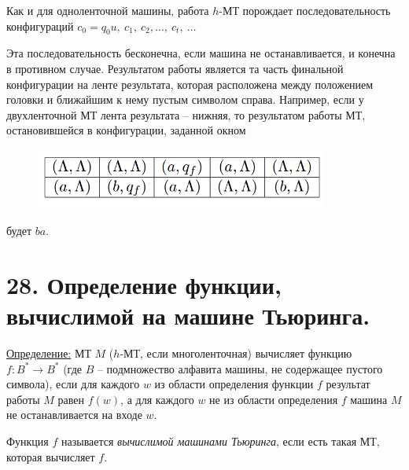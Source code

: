 \documentclass[a4paper, 12pt]{article}
\newcommand{\definition}{\underline{Определение:} }
\begin{document}
Как и для одноленточной машины, работа $h$-МТ порождает последовательность конфигураций $c_0 = q_0u,\ c_1,\ c_2, \ldots ,\ c_t,\ \ldots$

Эта последовательность бесконечна, если машина не останавливается, и конечна в противном случае. Результатом работы является та часть финальной конфигурации на ленте результата, которая расположена между положением головки и ближайшим к нему пустым символом справа. Например, если у двухленточной МТ
лента результата -- нижняя, то результатом работы МТ, остановившейся в конфигурации, заданной окном

\begin{figure}[h]
\begin{center}
    \begin{minipage}[h]{0.6\linewidth}
        \includegraphics[height=2cm, width=\linewidth]{images/Tab2MT.png}
    \end{minipage}
\end{center}
\end{figure}

будет $ba$.

\section*{28.  Определение функции, вычислимой на машине Тьюринга.}

\definition{МТ $M$ ($h$-МТ, если многоленточная) вычисляет функцию $f : B^{*} \to B^{*}$ (где $B$ -- подмножество алфавита машины, не содержащее пустого символа), если для каждого $w$ из области определения функции $f$ результат работы $M$ равен $f(w)$, а для каждого $w$ не из области определения $f$ машина $M$ не останавливается на входе $w$. 
}

Функция $f$ называется \textit{вычислимой машинами Тьюринга}, если есть такая МТ, которая вычисляет $f$.
\end{document}
